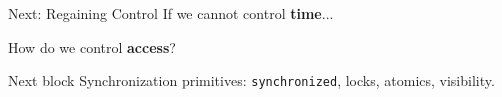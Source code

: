 \documentclass[aspectratio=169,11pt]{beamer}
\begin{document}
	\begin{frame}{Next: Regaining Control}
		If we cannot control \textbf{time}...
		
		\vspace{4mm}
		\begin{center}
			\Large
			How do we control \textbf{access}?
		\end{center}
		
		\vspace{4mm}
		\begin{block}{Next block}
			Synchronization primitives: \texttt{synchronized}, locks, atomics, visibility.
		\end{block}
	\end{frame}
	
\end{document}

